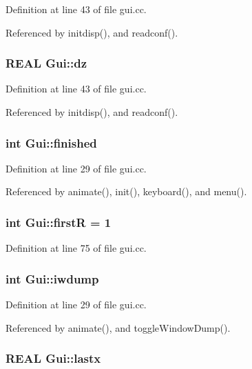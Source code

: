 Definition at line 43 of file gui.cc.

Referenced by initdisp(), and readconf().\hypertarget{namespaceGui_08f884685f2bc61bf9ba9f3a20f809c5}{
\subsubsection[{dz}]{\setlength{\rightskip}{0pt plus 5cm}REAL {\bf Gui::dz}}}
\label{namespaceGui_08f884685f2bc61bf9ba9f3a20f809c5}




Definition at line 43 of file gui.cc.

Referenced by initdisp(), and readconf().\hypertarget{namespaceGui_d167a9a00b5fcd633d94be01594f97c6}{
\subsubsection[{finished}]{\setlength{\rightskip}{0pt plus 5cm}int {\bf Gui::finished}}}
\label{namespaceGui_d167a9a00b5fcd633d94be01594f97c6}




Definition at line 29 of file gui.cc.

Referenced by animate(), init(), keyboard(), and menu().\hypertarget{namespaceGui_e1e212e4a0c46b3ff775b1aa017e7bfc}{
\subsubsection[{firstR}]{\setlength{\rightskip}{0pt plus 5cm}int {\bf Gui::firstR} = 1}}
\label{namespaceGui_e1e212e4a0c46b3ff775b1aa017e7bfc}




Definition at line 75 of file gui.cc.\hypertarget{namespaceGui_85922779b0101fa854b9b70a316998bd}{
\subsubsection[{iwdump}]{\setlength{\rightskip}{0pt plus 5cm}int {\bf Gui::iwdump}}}
\label{namespaceGui_85922779b0101fa854b9b70a316998bd}




Definition at line 29 of file gui.cc.

Referenced by animate(), and toggleWindowDump().\hypertarget{namespaceGui_67e596ec4c26da38c4c16edd4d3d8ffd}{
\subsubsection[{lastx}]{\setlength{\rightskip}{0pt plus 5cm}REAL {\bf Gui::lastx}}}
\label{namespaceGui_67e596ec4c26da38c4c16edd4d3d8ffd}




